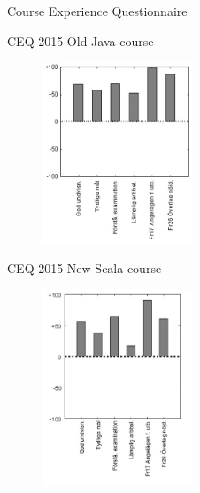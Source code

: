 \documentclass{lecturenotes}
\begin{document}
\begin{Slide}{Course Experience Questionnaire}
\begin{multicols}{2}

CEQ 2015 Old Java course
\begin{figure}
\includegraphics[width=0.4\textwidth]{img/CEQ-2015}
\end{figure}
\columnbreak

CEQ 2015 New Scala course

\begin{figure}
\includegraphics[width=0.4\textwidth]{img/CEQ-2016}
\end{figure}

\end{multicols}
\end{Slide}
\end{document}
